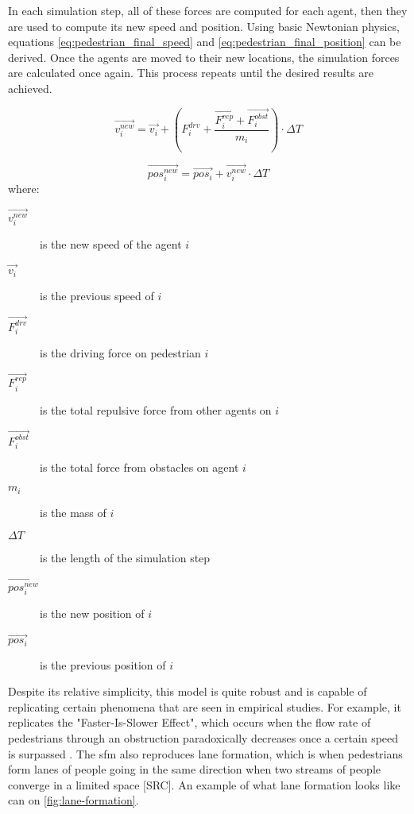 \documentclass[twoside, 11pt]{article}
\begin{document}
In each simulation step, all of these forces are computed for each agent, then they are used to compute its new speed and position. Using basic Newtonian physics, equations \eqref{eq:pedestrian_final_speed} and \eqref{eq:pedestrian_final_position} can be derived. Once the agents are moved to their new locations, the simulation forces are calculated once again. This process repeats until the desired results are achieved.

\begin{equation}
  \vec{v_i^{new}} = \vec{v_i} + ( F_i^{drv} + \frac{\vec{F_i^{rep}} + \vec{F_i^{obst}}}{m_i} ) \cdot \Delta T
  \label{eq:pedestrian_final_speed}
\end{equation}

\begin{equation}
  \vec{pos_i^{new}} = \vec{pos_i} + \vec{v_i^{new}} \cdot \Delta T
  \label{eq:pedestrian_final_position}
\end{equation}
where:
\begin{description}
  \item[$\vec{v_i^{new}}$] is the new speed of the agent $i$
  \item[$\vec{v_i}$] is the previous speed of $i$
  \item[$\vec{F_i^{drv}}$] is the driving force on pedestrian $i$
  \item[$\vec{F_i^{rep}}$] is the total repulsive force from other agents on $i$
  \item[$\vec{F_i^{obst}}$] is the total force from obstacles on agent $i$
  \item[$m_i$] is the mass of $i$ 
  \item[$\Delta T$] is the length of the simulation step
  \item[$\vec{pos_i^{new}}$] is the new position of $i$
  \item[$\vec{pos_i}$] is the previous position of $i$
\end{description}

Despite its relative simplicity, this model is quite robust and is capable of replicating certain phenomena that are seen in empirical studies. For example, it replicates the "Faster-Is-Slower Effect", which occurs when the flow rate of pedestrians through an obstruction paradoxically decreases once a certain speed is surpassed \cite{helbingSimulatingDynamicFeatures2000}. The \gls{sfm} also reproduces lane formation, which is when pedestrians form lanes of people going in the same direction when two streams of people converge in a limited space [SRC]. An example of what lane formation looks like can on \autoref{fig:lane-formation}.
\end{document}
